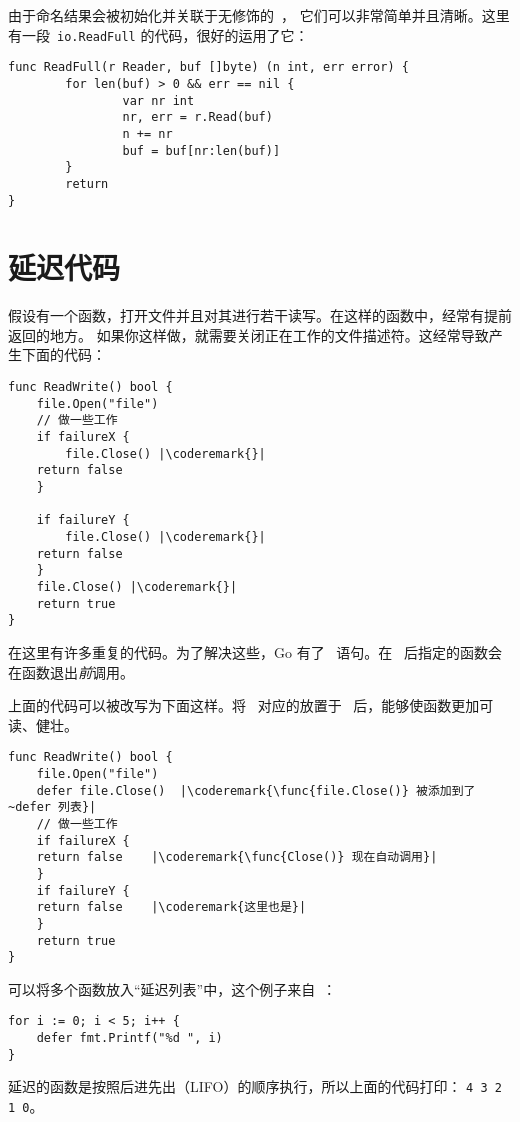 由于命名结果会被初始化并关联于无修饰的~，
它们可以非常简单并且清晰。这里有一段~\lstinline{io.ReadFull} 的代码，很好的运用了它：

\begin{lstlisting}
func ReadFull(r Reader, buf []byte) (n int, err error) {
        for len(buf) > 0 && err == nil {
                var nr int
                nr, err = r.Read(buf)
                n += nr
                buf = buf[nr:len(buf)]
        }
        return
}
\end{lstlisting}

\section{延迟代码}
\label{sec:deferred code}
假设有一个函数，打开文件并且对其进行若干读写。在这样的函数中，经常有提前返回的地方。
如果你这样做，就需要关闭正在工作的文件描述符。这经常导致产生下面的代码：
\begin{lstlisting}[caption=没有 defer]
func ReadWrite() bool {
    file.Open("file")
    // 做一些工作
    if failureX {
        file.Close() |\coderemark{}|
	return false
    }

    if failureY {
        file.Close() |\coderemark{}|
	return false
    }
    file.Close() |\coderemark{}|
    return true
}
\end{lstlisting}
在这里有许多重复的代码。为了解决这些，Go 有了~ 
语句。在~ 后指定的函数会在函数退出\emph{前}调用。

上面的代码可以被改写为下面这样。将~ 对应的放置于~ 
后，能够使函数更加可读、健壮。
\begin{lstlisting}[caption=With defer]
func ReadWrite() bool {
    file.Open("file")
    defer file.Close()	|\coderemark{\func{file.Close()} 被添加到了~defer 列表}|
    // 做一些工作
    if failureX {
	return false    |\coderemark{\func{Close()} 现在自动调用}|
    }
    if failureY {
	return false    |\coderemark{这里也是}|
    }
    return true
}
\end{lstlisting}

可以将多个函数放入``延迟列表''中，这个例子来自~\cite{effective_go}：
\begin{lstlisting}
for i := 0; i < 5; i++ { 
    defer fmt.Printf("%d ", i) 
} 
\end{lstlisting}
延迟的函数是按照后进先出（LIFO）的顺序执行，所以上面的代码打印：
\lstinline{4 3 2 1 0}。

